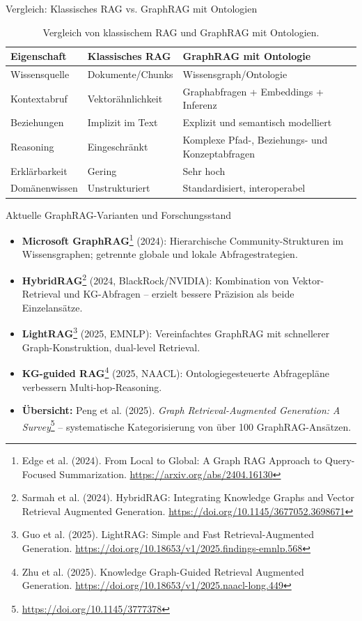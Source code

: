 \documentclass[aspectratio=1610, xcolor=dvipsnames, 9pt]{beamer}
\begin{document}
\begin{frame}{Vergleich: Klassisches RAG vs. GraphRAG mit Ontologien}
  \begin{table}[]
    \centering
    \begin{tabular}{|l|l|l|}
      \hline
      \textbf{Eigenschaft} & \textbf{Klassisches RAG} & \textbf{GraphRAG mit Ontologie} \\ \hline
      Wissensquelle & Dokumente/Chunks & Wissensgraph/Ontologie \\ \hline
      Kontextabruf & Vektorähnlichkeit & Graphabfragen + Embeddings + Inferenz \\ \hline
      Beziehungen & Implizit im Text & Explizit und semantisch modelliert \\ \hline
      Reasoning & Eingeschränkt & Komplexe Pfad-, Beziehungs- und Konzeptabfragen \\ \hline
      Erklärbarkeit & Gering & Sehr hoch \\ \hline
      Domänenwissen & Unstrukturiert & Standardisiert, interoperabel \\ \hline
    \end{tabular}
    \caption{Vergleich von klassischem RAG und GraphRAG mit Ontologien.}
  \end{table}
\end{frame}

\begin{frame}{Aktuelle GraphRAG-Varianten und Forschungsstand}
  \begin{itemize}
    \item \textbf{Microsoft GraphRAG}\footnote{Edge et al. (2024). From Local to Global: A Graph RAG Approach to Query-Focused Summarization. \url{https://arxiv.org/abs/2404.16130}} (2024): Hierarchische Community-Strukturen im Wissensgraphen; getrennte globale und lokale Abfragestrategien.
    \item \textbf{HybridRAG}\footnote{Sarmah et al. (2024). HybridRAG: Integrating Knowledge Graphs and Vector Retrieval Augmented Generation. \url{https://doi.org/10.1145/3677052.3698671}} (2024, BlackRock/NVIDIA): Kombination von Vektor-Retrieval und KG-Abfragen -- erzielt bessere Präzision als beide Einzelansätze.
    \item \textbf{LightRAG}\footnote{Guo et al. (2025). LightRAG: Simple and Fast Retrieval-Augmented Generation. \url{https://doi.org/10.18653/v1/2025.findings-emnlp.568}} (2025, EMNLP): Vereinfachtes GraphRAG mit schnellerer Graph-Konstruktion, dual-level Retrieval.
    \item \textbf{KG-guided RAG}\footnote{Zhu et al. (2025). Knowledge Graph-Guided Retrieval Augmented Generation. \url{https://doi.org/10.18653/v1/2025.naacl-long.449}} (2025, NAACL): Ontologiegesteuerte Abfragepläne verbessern Multi-hop-Reasoning.
    \item \textbf{Übersicht:} Peng et al. (2025). \textit{Graph Retrieval-Augmented Generation: A Survey}\footnote{\url{https://doi.org/10.1145/3777378}} -- systematische Kategorisierung von über 100 GraphRAG-Ansätzen.
  \end{itemize}
\end{frame}
\end{document}
